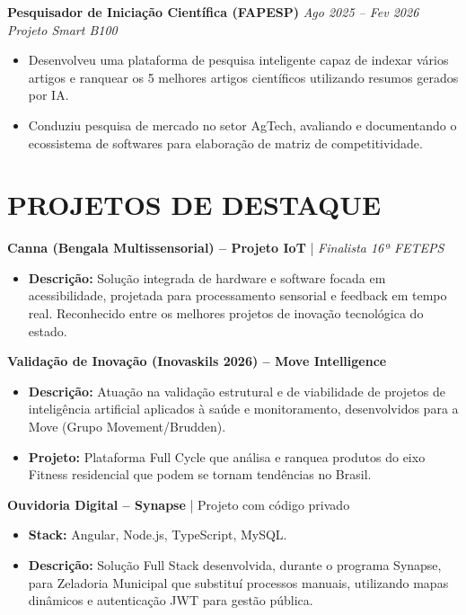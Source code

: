 \documentclass[11pt,a4paper]{article}
\begin{document}
\vspace{0.2cm}
\textbf{Pesquisador de Iniciação Científica (FAPESP)} \hfill \textit{Ago 2025 -- Fev 2026} \\
\textit{Projeto Smart B100} \\
\begin{itemize}
    \item Desenvolveu uma plataforma de pesquisa inteligente capaz de indexar vários artigos e ranquear os 5 melhores artigos científicos utilizando resumos gerados por IA.
    \item Conduziu pesquisa de mercado no setor AgTech, avaliando e documentando o ecossistema de softwares para elaboração de matriz de competitividade.
\end{itemize}

\vspace{0.2cm}
\section*{PROJETOS DE DESTAQUE}
\textbf{Canna (Bengala Multissensorial) -- Projeto IoT} | \textit{Finalista 16ª FETEPS}
\begin{itemize}
    \item \textbf{Descrição:} Solução integrada de hardware e software focada em acessibilidade, projetada para processamento sensorial e feedback em tempo real. Reconhecido entre os melhores projetos de inovação tecnológica do estado.
\end{itemize}

\textbf{Validação de Inovação (Inovaskils 2026) -- Move Intelligence}
\begin{itemize}
    \item \textbf{Descrição:} Atuação na validação estrutural e de viabilidade de projetos de inteligência artificial aplicados à saúde e monitoramento, desenvolvidos para a Move (Grupo Movement/Brudden).
    \item \textbf{Projeto:} Plataforma Full Cycle que análisa e ranquea produtos do eixo Fitness residencial que podem se tornam tendências no Brasil.
\end{itemize}

\textbf{Ouvidoria Digital -- Synapse} | {Projeto com código privado}
\begin{itemize}
    \item \textbf{Stack:} Angular, Node.js, TypeScript, MySQL.
    \item \textbf{Descrição:} Solução Full Stack desenvolvida, durante o programa Synapse, para Zeladoria Municipal que substituí processos manuais, utilizando mapas dinâmicos e autenticação JWT para gestão pública.
\end{itemize}
\end{document}
